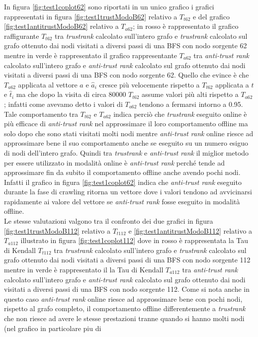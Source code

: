 In figura \ref{fig:test1coplot62} sono riportati in un unico grafico i grafici rappresentati in figura \ref{fig:test1trustModoB62} relativo a \(T_{t62}\) e del  grafico \ref{fig:test1antitrustModoB62} relativo a \(T_{a62}\); in rosso è rappresentato il grafico raffigurante \(T_{t62}\) tra \textit{trustrank} calcolato sull'intero grafo e \textit{trustrank} calcolato sul grafo ottenuto dai nodi visitati a diversi passi di una BFS con nodo sorgente 62 mentre in verde è rappresentato il grafico  rappresentante \(T_{a62}\) tra \textit{anti-trust rank} calcolato sull'intero grafo e \textit{anti-trust rank} calcolato sul grafo ottenuto dai nodi visitati a diversi passi di una BFS con nodo sorgente 62. Quello che evince è che \(T_{a62}\) applicata al vettore \(a\) e \(\hat{a}_i\) cresce più velocemente rispetto a \(T_{t62}\) applicata a   \(t\) e \(\hat{t}_i\) ma che dopo la visita di circa 80000 \(T_{t62}\) assume valori più alti rispetto a \(T_{a62}\); infatti come avevamo detto i valori di \(T_{a62}\) tendono a 
fermarsi intorno a 0.95.\\
Tale comportamento tra \(T_{t62}\) e \(T_{a62}\) indica perciò che \textit{trustrank} eseguito online è più efficace di \textit{anti-trust rank} nel approssimare il loro comportamento offline ma solo dopo che sono stati visitati molti nodi mentre \textit{anti-trust rank} online riesce ad approssimare bene il suo comportamento anche se eseguito su un numero esiguo di nodi dell'intero grafo. Quindi  tra \textit{trustrank} e \textit{anti-trust rank} il miglior metodo per essere utilizzato in modalità online è \textit{anti-trust rank} perché tende ad approssimare fin da subito il comportamento offline anche avendo pochi nodi. Infatti il grafico in figura \ref{fig:test1coplot62} indica che \textit{anti-trust rank} eseguito durante la fase di crawling ritorna un vettore dove i valori tendono ad avvicinarsi rapidamente ai valore del vettore se \textit{anti-trust rank} fosse eseguito in modalità offline.\\
Le stesse valutazioni valgono tra il confronto dei due grafici in figura \ref{fig:test1trustModoB112} relativo a \(T_{t112}\) e \ref{fig:test1antitrustModoB112}  relativo a \(T_{a112}\) illustrato in figura \ref{fig:test1coplot112} dove in rosso è rappresentata la Tau di Kendall \(T_{t112}\) tra \textit{trustrank} calcolato sull'intero grafo e \textit{trustrank} calcolato sul grafo ottenuto dai nodi visitati a diversi passi di una BFS con nodo sorgente 112 mentre in verde è rappresentato il la Tau di Kendall \(T_{a112}\) tra \textit{anti-trust rank} calcolato sull'intero grafo e \textit{anti-trust rank} calcolato sul grafo ottenuto dai nodi visitati a diversi passi di una BFS con nodo sorgente 112. Come si nota anche in questo caso \textit{anti-trust rank} online riesce ad approssimare bene con  pochi nodi, rispetto al grafo completo, il comportamento offline differentemente a \textit{trustrank} che non riesce ad avere le stesse prestazioni tranne quando si hanno molti nodi (nel grafico in particolare piu di 
